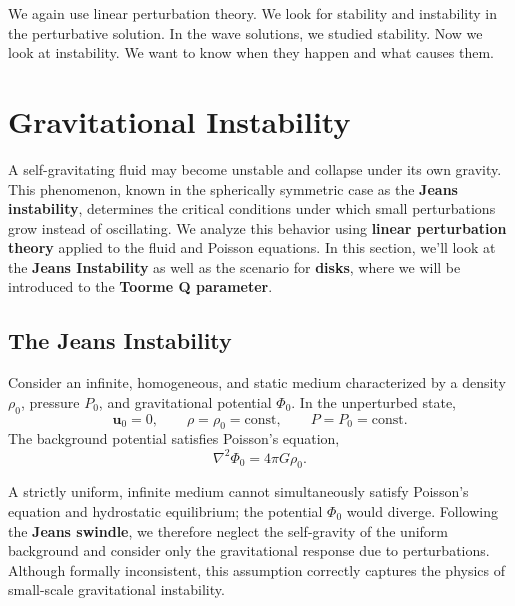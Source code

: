 We again use linear perturbation theory. We look for stability and instability in the perturbative solution. In the wave solutions, we studied stability. Now we look at instability. We want to know when they happen and what causes them.

\section{Gravitational Instability}

A self-gravitating fluid may become unstable and collapse under its own gravity.  
This phenomenon, known in the spherically symmetric case as the \textbf{Jeans instability}, determines the critical conditions under which small perturbations grow instead of oscillating. We analyze this behavior using \textbf{linear perturbation theory} applied to the fluid and Poisson equations. In this section, we'll look at the \textbf{Jeans Instability} as well as the scenario for \textbf{disks}, where we will be introduced to the \textbf{Toorme Q parameter}.

\subsection{The Jeans Instability}

Consider an infinite, homogeneous, and static medium characterized by a density $\rho_0$, pressure $P_0$, and gravitational potential $\Phi_0$.  
In the unperturbed state,
\begin{equation}
\mathbf{u}_0 = 0, 
\qquad 
\rho = \rho_0 = \text{const}, 
\qquad 
P = P_0 = \text{const}.
\end{equation}
The background potential satisfies Poisson’s equation,
\begin{equation}
\nabla^2 \Phi_0 = 4\pi G \rho_0.
\end{equation}

\begin{remark}
A strictly uniform, infinite medium cannot simultaneously satisfy Poisson’s equation and hydrostatic equilibrium; the potential $\Phi_0$ would diverge.  
Following the \textbf{Jeans swindle}, we therefore neglect the self-gravity of the uniform background and consider only the gravitational response due to perturbations.  
Although formally inconsistent, this assumption correctly captures the physics of small-scale gravitational instability.
\end{remark}

